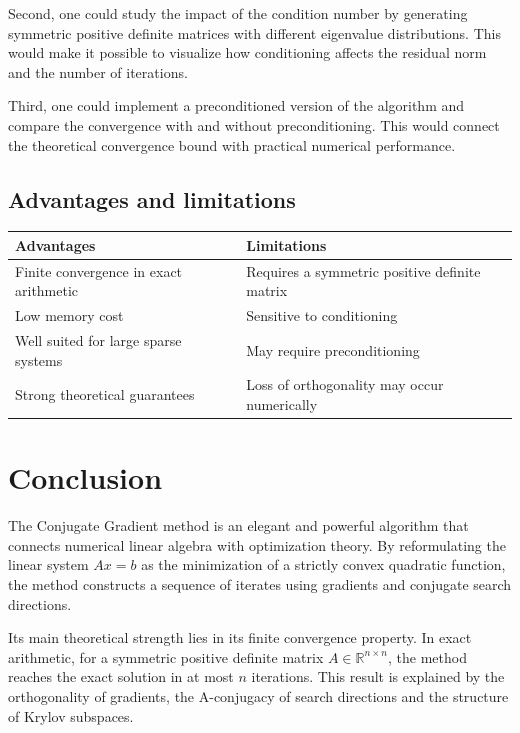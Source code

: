 \documentclass[11pt,a4paper]{report}
\theoremstyle{definition}
\theoremstyle{plain}
\theoremstyle{remark}
\begin{document}
Second, one could study the impact of the condition number by generating symmetric positive definite matrices with different eigenvalue distributions. This would make it possible to visualize how conditioning affects the residual norm and the number of iterations.

Third, one could implement a preconditioned version of the algorithm and compare the convergence with and without preconditioning. This would connect the theoretical convergence bound with practical numerical performance.

\section{Advantages and limitations}

\begin{center}
\begin{tabular}{p{}p{}}
\toprule
\textbf{Advantages} & \textbf{Limitations} \\
\midrule
Finite convergence in exact arithmetic & Requires a symmetric positive definite matrix \\
Low memory cost & Sensitive to conditioning \\
Well suited for large sparse systems & May require preconditioning \\
Strong theoretical guarantees & Loss of orthogonality may occur numerically \\
\bottomrule
\end{tabular}
\end{center}

\chapter*{\centering\color{bleufonce}Conclusion}

The Conjugate Gradient method is an elegant and powerful algorithm that connects numerical linear algebra with optimization theory. By reformulating the linear system $Ax=b$ as the minimization of a strictly convex quadratic function, the method constructs a sequence of iterates using gradients and conjugate search directions.

Its main theoretical strength lies in its finite convergence property. In exact arithmetic, for a symmetric positive definite matrix $A\in\mathbb{R}^{n\times n}$, the method reaches the exact solution in at most $n$ iterations. This result is explained by the orthogonality of gradients, the A-conjugacy of search directions and the structure of Krylov subspaces.
\end{document}
